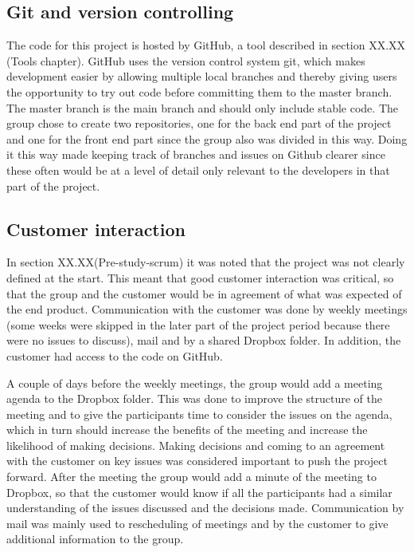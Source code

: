 \subsection{Git and version controlling}

The code for this project is hosted by GitHub, a tool described in section XX.XX (Tools chapter). GitHub uses the version control system git, which makes development easier by allowing multiple local branches and thereby giving users the opportunity to try out code before committing them to the master branch. The master branch is the main branch and should only include stable code. The group chose to create two repositories, one for the back end part of the project and one for the front end part since the group also was divided in this way. Doing it this way made keeping track of branches and issues on Github clearer since these often would be at a level of detail only relevant to the developers in that part of the project. 

\subsection{Customer interaction}

In section XX.XX(Pre-study-scrum) it was noted that the project was not clearly defined at the start. This meant that good customer interaction was critical, so that the group and the customer would be in agreement of what was expected of the end product. Communication with the customer was done by weekly meetings (some weeks were skipped in the later part of the project period because there were no issues to discuss), mail and by a shared Dropbox folder. In addition, the customer had access to the code on GitHub. \newline

A couple of days before the weekly meetings, the group would add a meeting agenda to the Dropbox folder. This was done to improve the structure of the meeting and to give the participants time to consider the issues on the agenda, which in turn should increase the benefits of the meeting and increase the likelihood of making decisions. Making decisions and coming to an agreement with the customer on key issues was considered important to push the project forward. After the meeting the group would add a minute of the meeting to Dropbox, so that the customer would know if all the participants had a similar understanding of the issues discussed and the decisions made. Communication by mail was mainly used to rescheduling of meetings and by the customer to give additional information to the group. 

\cleardoublepage